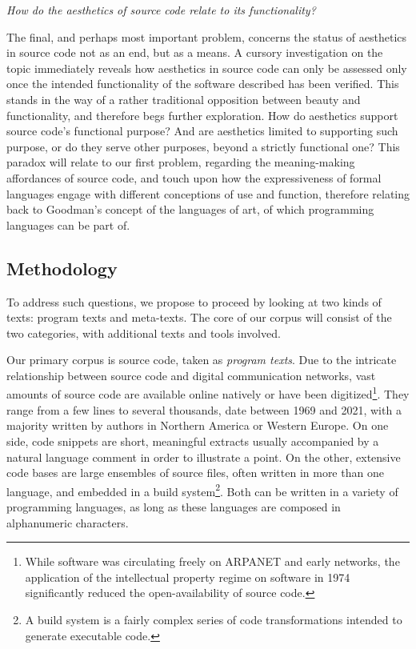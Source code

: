 \vspace*{1\baselineskip}

\emph{How do the aesthetics of source code relate to its functionality?}

The final, and perhaps most important problem, concerns the status of aesthetics in source code not as an end, but as a means. A cursory investigation on the topic immediately reveals how aesthetics in source code can only be assessed only once the intended functionality of the software described has been verified. This stands in the way of a rather traditional opposition between beauty and functionality, and therefore begs further exploration. How do aesthetics support source code's functional purpose? And are aesthetics limited to supporting such purpose, or do they serve other purposes, beyond a strictly functional one? This paradox will relate to our first problem, regarding the meaning-making affordances of source code, and touch upon how the expressiveness of formal languages engage with different conceptions of use and function, therefore relating back to Goodman's concept of the languages of art, of which programming languages can be part of.

\subsection{Methodology}

To address such questions, we propose to proceed by looking at two kinds of texts: program texts and meta-texts. The core of our corpus will consist of the two categories, with additional texts and tools involved.

Our primary corpus is source code, taken as \emph{program texts}. Due to the intricate relationship between source code and digital communication networks, vast amounts of source code are available online natively or have been digitized\footnote{While software was circulating freely on ARPANET and early networks, the application of the intellectual property regime on software in 1974 significantly reduced the open-availability of source code.}. They range from a few lines to several thousands, date between 1969 and 2021, with a majority written by authors in Northern America or Western Europe. On one side, code snippets are short, meaningful extracts usually accompanied by a natural language comment in order to illustrate a point. On the other, extensive code bases are large ensembles of source files, often written in more than one language, and embedded in a build system\footnote{A build system is a fairly complex series of code transformations intended to generate executable code.}. Both can be written in a variety of programming languages, as long as these languages are composed in alphanumeric characters.

